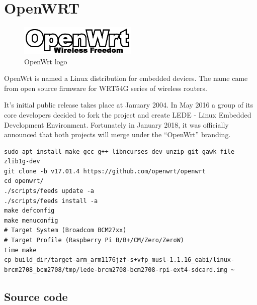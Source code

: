 \documentclass[printmode]{mgr}
\begin{document}
\section{OpenWRT}

\begin{figure}[htbp]
  \centering
    \includegraphics[width=0.5\textwidth]{openwrt-logo.png}
    \caption{OpenWrt logo}
  \label{fig:openwrt-logo}
\end{figure}

OpenWrt is named a Linux distribution for embedded devices. The name came from open source firmware for WRT54G series of wireless routers.

It's initial public release takes place at January 2004. In May 2016 a group of its core developers decided to fork the project and create LEDE - Linux Embedded Development Environment. Fortunately in January 2018, it was officially announced that both projects will merge under the ``OpenWrt'' branding.





\begin{lstlisting}
sudo apt install make gcc g++ libncurses-dev unzip git gawk file zlib1g-dev
git clone -b v17.01.4 https://github.com/openwrt/openwrt
cd openwrt/
./scripts/feeds update -a
./scripts/feeds install -a
make defconfig
make menuconfig
# Target System (Broadcom BCM27xx)
# Target Profile (Raspberry Pi B/B+/CM/Zero/ZeroW)
time make
cp build_dir/target-arm_arm1176jzf-s+vfp_musl-1.1.16_eabi/linux-brcm2708_bcm2708/tmp/lede-brcm2708-bcm2708-rpi-ext4-sdcard.img ~
\end{lstlisting}



\subsection*{Source code}
\end{document}
